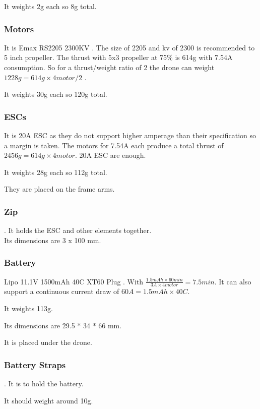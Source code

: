 It weights 2g each so 8g total.

\subsubsection{Motors}
It is Emax RS2205 2300KV \cite{bangood_motor}. The size of 2205 and kv of 2300 is recommended to 5 inch propeller. The thrust with 5x3 propeller at 75\% is 614g with 7.54A consumption. So for a thrust/weight ratio of 2 the drone can weight $1228g=614g \times 4motor / 2$ \cite{google_sheets_motor}.

It weights 30g each so 120g total.

\subsubsection{ESCs}
It is 20A ESC \cite{bangood_esc} as they do not support higher amperage than their specification so a margin is taken. The motors for 7.54A each produce a total thrust of $2456g=614g\times 4motor$. 20A ESC are enough.

It weights 28g each so 112g total.

They are placed on the frame arms.

\subsubsection{Zip}
\cite{bangood_zip_ties}. It holds the ESC and other elements together.\\
Its dimensions are 3 x 100 mm.

\subsubsection{Battery}
Lipo 11.1V 1500mAh 40C XT60 Plug \cite{bangood_battery}. With $ \frac{1.5mAh \times 60min}{3A \times 4motor}= 7.5min$. It can also support a continuous current draw of $60A = 1.5mAh\times 40C$.

It weights 113g.

Its dimensions are 29.5 * 34 * 66 mm.

It is placed under the drone.

\subsubsection{Battery Straps}
\cite{bangood_battery_strap}. It is to hold the battery.

It should weight around 10g.

